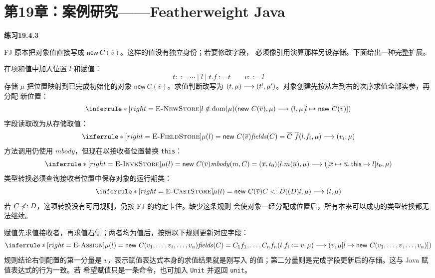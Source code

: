 \section*{第19章：案例研究——Featherweight Java}

\begin{taplsolutionentrybox}
\label{sol:translator:19.4.3}
\textbf{练习19.4.3}

FJ 原本把对象值直接写成
\(\mathsf{new}\ C(\overline v)\)。这样的值没有独立身份；若要修改字段，
必须像引用演算那样另设存储。下面给出一种完整扩展。

在项和值中加入位置 \(l\) 和赋值：
\[
 t::=\cdots\mid l\mid t.f:=t
 \qquad
 v::=l
\]
存储 \(\mu\) 把位置映射到已完成初始化的对象
\(\mathsf{new}\ C(\overline v)\)。求值判断改写为
\((t,\mu)\mathrel{\longrightarrow}(t',\mu')\)。对象创建先按从左到右的次序求值全部实参，再分配
新位置：
\[
\inferrule*[right=\textsc{E-NewStore}]
 {l\notin\operatorname{dom}(\mu)}
 {(\mathsf{new}\ C(\overline v),\mu)
  \trans
  (l,\mu[l\mapsto\mathsf{new}\ C(\overline v)])}
\]
字段读取改为从存储取值：
\[
\inferrule*[right=\textsc{E-FieldStore}]
 {\mu(l)=\mathsf{new}\ C(\overline v)\\
  \mathit{fields}(C)=\overline C\ \overline f}
 {(l.f_i,\mu)\trans(v_i,\mu)}
\]
方法调用仍使用 \(\mathit{mbody}\)，但现在以接收者位置替换
\texttt{this}：
\[
\inferrule*[right=\textsc{E-InvkStore}]
 {\mu(l)=\mathsf{new}\ C(\overline v)\\
  \mathit{mbody}(m,C)=(\overline x,t_0)}
 {(l.m(\overline u),\mu)
  \trans
  ([\overline x\mapsto\overline u,\mathsf{this}\mapsto l]t_0,\mu)}
\]
类型转换必须查询接收者位置中保存对象的运行期类：
\[
\inferrule*[right=\textsc{E-CastStore}]
 {\mu(l)=\mathsf{new}\ C(\overline v)\\C\subtype D}
 {((D)l,\mu)\trans(l,\mu)}
\]
若 \(C\mathrel{\not<:} D\)，这项转换没有可用规则，仍按 FJ 的约定卡住。缺少这条规则
会使对象一经分配成位置后，所有本来可以成功的类型转换都无法继续。

赋值先求值接收者，再求值右侧；两者均为值后，按照以下规则更新对应字段：
\[
\inferrule*[right=\textsc{E-Assign}]
 {\mu(l)=\mathsf{new}\ C(v_1,\ldots,v_i,\ldots,v_n)\\
  \mathit{fields}(C)=C_1f_1,\ldots,C_nf_n}
 {(l.f_i:=v,\mu)
  \trans
  (v,\mu[l\mapsto\mathsf{new}\ C(v_1,\ldots,v,\ldots,v_n)])}
\]
规则结论右侧配置的第一分量是 \(v\)，表示赋值表达式本身的求值结果就是刚写入
的值；第二分量则是完成字段更新后的存储。这与 Java 赋值表达式的行为一致。若
希望赋值只是一条命令，也可加入 \texttt{Unit} 并返回 \texttt{unit}。


\end{taplsolutionentrybox}
